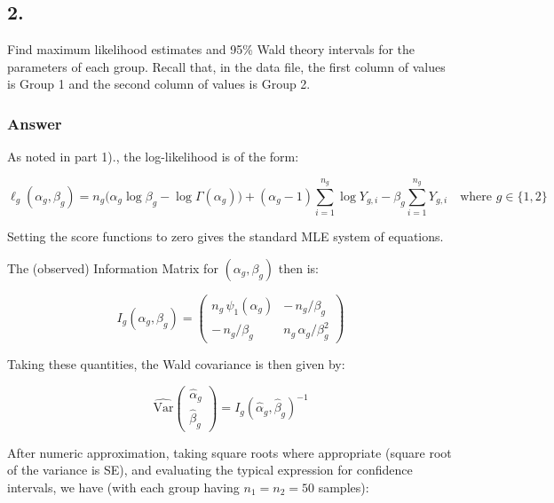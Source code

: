 \documentclass[
]{article}
\begin{document}
\newpage

\subsection{2.}\label{section-1}

Find maximum likelihood estimates and 95\% Wald theory intervals for the
parameters of each group. Recall that, in the data file, the first
column of values is Group 1 and the second column of values is Group 2.

\subsubsection{Answer}\label{answer-1}

As noted in part 1)., the log-likelihood is of the form:

\[
\ell_g(\alpha_g,\beta_g)
= n_g\big(\alpha_g\log\beta_g-\log\Gamma(\alpha_g)\big)
 +(\alpha_g-1)\sum_{i=1}^{n_g}\log Y_{g,i}
 -\beta_g\sum_{i=1}^{n_g}Y_{g,i} \quad \text{where } g \in \{1, 2\}
\]

Setting the score functions to zero gives the standard MLE system of
equations.

The (observed) Information Matrix for \((\alpha_g,\beta_g)\) then is:

\[
I_g(\alpha_g,\beta_g)=
\begin{pmatrix}
n_g\,\psi_{1}(\alpha_g) & -\,n_g/\beta_g\\[4pt]
-\,n_g/\beta_g & n_g\,\alpha_g/\beta_g^2
\end{pmatrix}
\]

Taking these quantities, the Wald covariance is then given by:

\[
\widehat{\mathrm{Var}}\!\begin{pmatrix}\hat\alpha_g\\ \hat\beta_g\end{pmatrix}
= I_g(\hat\alpha_g,\hat\beta_g)^{-1}
\]

After numeric approximation, taking square roots where appropriate
(square root of the variance is SE), and evaluating the typical
expression for confidence intervals, we have (with each group having
\(n_1=n_2=50\) samples):
\end{document}

